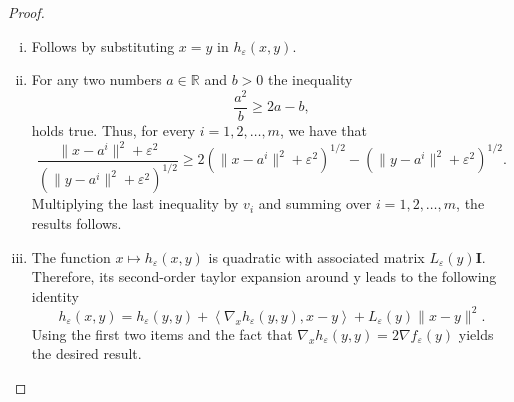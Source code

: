 \documentclass[12pt]{article}
\numberwithin{equation}{section}
\begin{document}
\begin{proof}
\begin{enumerate}[(i)]
	\item Follows by substituting $x=y$ in $h_{\varepsilon}(x,y)$.
	\item For any two numbers $a \in \mathbb{R}$ and $b>0$ the inequality 
	\begin{equation*}
		\frac{a^2}{b} \geq 2a - b ,
	\end{equation*}
	holds true. Thus, for every $i=1,2, \ldots ,m$, we have that
	\begin{equation*}
		\frac{\|x-a^i\|^2 + {\varepsilon}^2}{\left( \|y-a^i\|^2 + {\varepsilon}^2 \right)^{1/2}} \geq 2\left( \|x-a^i\|^2 + {\varepsilon}^2 \right)^{1/2} - \left( \|y-a^i\|^2 + {\varepsilon}^2 \right)^{1/2} .
	\end{equation*}
	Multiplying the last inequality by $v_i$ and summing over $i=1,2, \ldots, m$, the results follows. 
	\item The function $x \mapsto h_{\varepsilon}(x,y)$ is quadratic with associated matrix $L_{\varepsilon}(y)\textbf{I}$. Therefore, its second-order taylor expansion around y leads to the following identity
	\begin{equation*}
		h_{\varepsilon}(x,y) = h_{\varepsilon}(y,y) + \left\langle \nabla_x h_{\varepsilon}(y,y) , x-y \right\rangle + L_{\varepsilon}(y) \|x-y\|^2 .
	\end{equation*}
	Using the first two items and the fact that $\nabla_x h_{\varepsilon}(y,y) = 2\nabla f_{\varepsilon}(y)$ yields the desired result.
\end{enumerate}
\end{proof}
\end{document}
